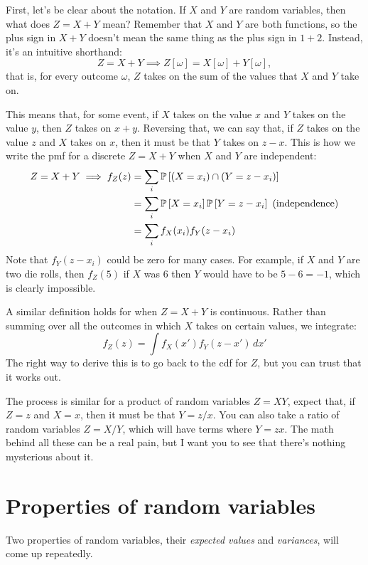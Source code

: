 First, let's be clear about the notation. If $X$ and $Y$ are random variables,
then what does $Z = X + Y$ mean? Remember that $X$ and $Y$ are both functions,
so the plus sign in $X + Y$ doesn't mean the same thing as the plus sign in $1
+ 2$. Instead, it's an intuitive shorthand:
\begin{equation}
Z = X + Y \implies Z[\omega] = X[\omega] + Y[\omega],
\end{equation}
that is, for every outcome $\omega$, $Z$ takes on the sum of the values that
$X$ and $Y$ take on.

This means that, for some event, if $X$ takes on the value $x$ and $Y$ takes
on the value $y$, then $Z$ takes on $x+y$. Reversing that, we can say that, if
$Z$ takes on the value $z$ and $X$ takes on $x$, then it must be that $Y$
takes on $z - x$. This is how we write the pmf for a discrete $Z = X + Y$ when
$X$ and $Y$ are independent:
\begin{align*}
Z = X + Y \implies f_Z(z) &= \sum_i \mathbb{P}\left[{(X=x_i) \cap (Y=z - x_i)}\right] \\
  &= \sum_i \mathbb{P}\left[{X=x_i}\right] \mathbb{P}\left[{Y=z-x_i}\right] \text{ (independence)} \\
  &= \sum_i f_X(x_i) f_Y(z - x_i)
\end{align*}
Note that $f_Y(z-x_i)$ could be zero for many cases. For example, if $X$ and
$Y$ are two die rolls, then $f_Z(5)$ if $X$ was 6 then $Y$ would have to be $5
- 6 = -1$, which is clearly impossible.

A similar definition holds for when $Z = X + Y$ is continuous. Rather than
summing over all the outcomes in which $X$ takes on certain values, we integrate:
\begin{equation}
f_Z(z) = \int f_X(x') f_Y(z - x') \,dx'
\end{equation}
The right way to derive this is to go back to the cdf for $Z$, but you can
trust that it works out.

The process is similar for a product of random variables $Z = XY$, expect
that, if $Z = z$ and $X = x$, then it must be that $Y = z/x$. You can also
take a ratio of random variables $Z = X/Y$, which will have terms where $Y =
zx$. The math behind all these can be a real pain, but I want you to see that
there's nothing mysterious about it.

\section{Properties of random variables}

Two properties of random variables, their \emph{expected values} and
\emph{variances}, will come up repeatedly.

